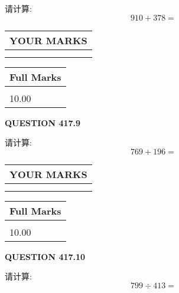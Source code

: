 \documentclass{ctexart}
\begin{document}
  
 
请计算:
\begin{equation}
910 +  %
378 = \nonumber
\end{equation}
 

 

 
  
\vspace{0.2in}
  
\noindent\begin{tabular}{|l|}
\hline
 YOUR MARKS  \\
\hline
 \\ 
 \\ 
\hline
\end{tabular}
\hspace{0.05in} \begin{tabular}{|l|}
\hline
 Full Marks  \\
\hline
 \\ 
10.00 \\
\hline
\end{tabular}
{\textbf{\Large{QUESTION
417.9 
}}}
  
  
 
请计算:
\begin{equation}
769 +  %
196 = \nonumber
\end{equation}
 

 

 
  
\vspace{0.2in}
  
\noindent\begin{tabular}{|l|}
\hline
 YOUR MARKS  \\
\hline
 \\ 
 \\ 
\hline
\end{tabular}
\hspace{0.05in} \begin{tabular}{|l|}
\hline
 Full Marks  \\
\hline
 \\ 
10.00 \\
\hline
\end{tabular}
{\textbf{\Large{QUESTION
417.10 
}}}
  
  
 
请计算:
\begin{equation}
799  \div    %
413 = \nonumber
\end{equation}
 

 

 
   
\end{document}
